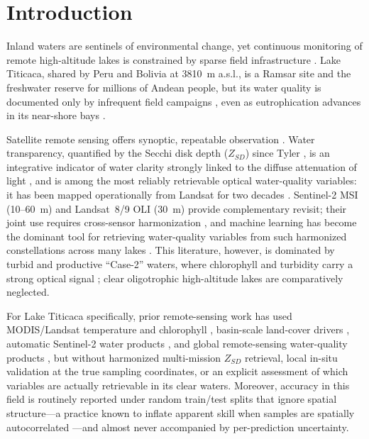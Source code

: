 \documentclass[remotesensing,article,submit,pdftex,moreauthors]{Definitions/mdpi}
\begin{document}
\section{Introduction}
Inland waters are sentinels of environmental change, yet continuous monitoring of
remote high-altitude lakes is constrained by sparse field infrastructure
\cite{Williamson2009}. Lake Titicaca, shared by Peru and Bolivia at 3810~m
a.s.l., is a Ramsar site and the freshwater reserve for millions of Andean people,
but its water quality is documented only by infrequent field campaigns
\cite{OEFA2016,Siguayro2022eval}, even as eutrophication advances in its
near-shore bays \cite{Heredia2022,Lanza2024}.

Satellite remote sensing offers synoptic, repeatable observation
\cite{Gholizadeh2016,Topp2020}. Water transparency, quantified by the Secchi disk
depth ($Z_{SD}$) since Tyler \cite{Tyler1968}, is an integrative indicator of water
clarity strongly linked to the diffuse attenuation of light \cite{Lee2015}, and is
among the most reliably retrievable optical water-quality variables: it has been
mapped operationally from Landsat for two decades
\cite{Kloiber2002,Olmanson2008,Zhang2022}. Sentinel-2 MSI (10--60~m) and
Landsat~8/9 OLI (30~m) provide complementary revisit; their joint use requires
cross-sensor harmonization \cite{Roy2016,Claverie2018,Pahlevan2019}, and machine
learning has become the dominant tool for retrieving water-quality variables from
such harmonized constellations across many lakes
\cite{Pahlevan2020,Cao2020,Cao2022,Arias2023,Pahlevan2022,Hafeez2019,Tian2023}.
This literature, however, is dominated by turbid and productive ``Case-2'' waters,
where chlorophyll and turbidity carry a strong optical signal
\cite{Gitelson2009,Mishra2012,Nechad2010,Dogliotti2015}; clear oligotrophic
high-altitude lakes are comparatively neglected.

For Lake Titicaca specifically, prior remote-sensing work has used MODIS/Landsat
temperature and chlorophyll \cite{RuizVerdu2016}, basin-scale land-cover drivers
\cite{Baltodano2022}, automatic Sentinel-2 water products \cite{AyalaIzurieta2023},
and global remote-sensing water-quality products \cite{Maligaya2024}, but without
harmonized multi-mission $Z_{SD}$ retrieval, local in-situ validation at the true
sampling coordinates, or an explicit assessment of which variables are actually
retrievable in its clear waters. Moreover, accuracy in this field is routinely
reported under random train/test splits that ignore spatial structure---a practice
known to inflate apparent skill when samples are spatially autocorrelated
\cite{Roberts2017,Ploton2020}---and almost never accompanied by per-prediction
uncertainty.
\end{document}
